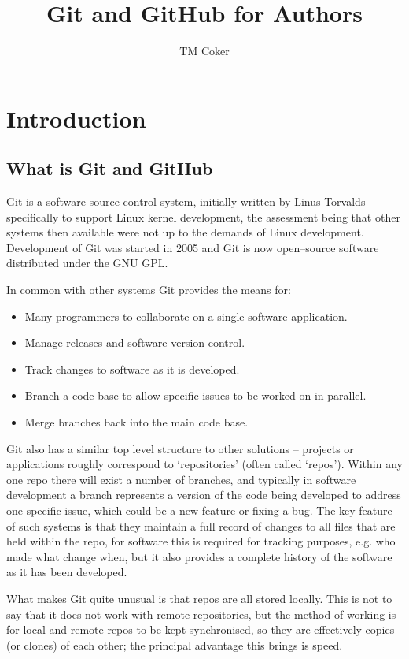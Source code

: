 \documentclass[a4paper, 12pt]{article}
\title{Git and GitHub for Authors}
\author{TM Coker}
\begin{document}
\maketitle
\section{Introduction}
\subsection{What is Git and GitHub}
\label{whatis}
Git is a software source control system, initially written by Linus Torvalds specifically to support Linux kernel development, the assessment being that other systems then available were not up to the demands of Linux development. Development of Git was started in 2005 and Git is now open--source software distributed under the GNU GPL.

In common with other systems Git provides the means for:
\begin{itemize}
\item Many programmers to collaborate on a single software application.
\item Manage releases and software version control.
\item Track changes to software as it is developed.
\item Branch a code base to allow specific issues to be worked on in parallel.
\item Merge branches back into the main code base.
\end{itemize}

Git also has a similar top level structure to other solutions -- projects or applications roughly correspond to `repositories' (often called `repos'). Within any one repo there will exist a number of branches, and typically in software development a branch represents a version of the code being developed to address one specific issue, which could be a new feature or fixing a bug. The key feature of such systems is that they maintain a full record of changes to all files that are held within the repo, for software this is required for tracking purposes, e.g. who made what change when, but it also provides a complete history of the software as it has been developed.

What makes Git quite unusual is that repos are all stored locally. This is not to say that it does not work with remote repositories, but the method of working is for local and remote repos to be kept synchronised, so they are effectively copies (or clones) of each other; the principal advantage this brings is speed.
\end{document}

